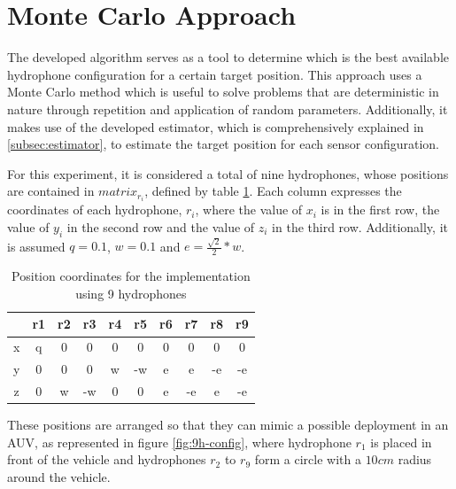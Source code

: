 \section{Monte Carlo Approach} \label{sec:config-perf}

The developed algorithm serves as a tool to determine which is the best available hydrophone configuration for a certain target position. This approach uses a Monte Carlo method which is useful to solve problems that are deterministic in nature through repetition and application of random parameters. Additionally, it makes use of the developed estimator, which is comprehensively explained in \ref{subsec:estimator}, to estimate the target position for each sensor configuration.
		
For this experiment, it is considered a total of nine hydrophones, whose positions are contained in $matrix_{r_{i}}$, defined by table \ref{tab:config-9h}. Each column expresses the coordinates of each hydrophone, $r_i$, where the value of $x_i$ is in the first row, the value of $y_i$ in the second row and the value of $z_i$ in the third row. Additionally, it is assumed $q = 0.1$, $w = 0.1$ and $e = \frac{ \sqrt{2}}{2} * w$.

\begin{table}[!htbp] %
	\begin{center}
		\begin{tabular}{c | c c c c c c c c c}
			\toprule
			& r1 & r2 & r3 & r4	& r5 & r6 & r7 & r8	& r9 \\ \hline 
			\multirow{1}{0.5em}{x} 
			& q & 0 & 0 & 0 & 0 & 0 & 0 & 0 & 0\\
			\midrule 
			\multirow{1}{0.5em}{y} 
			& 0 & 0 & 0 & w & -w & e & e & -e & -e\\
			\midrule 
			\multirow{1}{0.5em}{z} 
			& 0 & w & -w & 0 & 0 & e & -e & e & -e \\
			\bottomrule 
		\end{tabular}
		\caption{Position coordinates for the implementation using 9 hydrophones}
		\label{tab:config-9h}
	\end{center}
\end{table}

These positions are arranged so that they can mimic a possible deployment in an AUV, as represented in figure \ref{fig:9h-config}, where hydrophone $r_1$ is placed in front of the vehicle and hydrophones $r_2$ to $r_9$ form a circle with a $10 cm$ radius around the vehicle.

